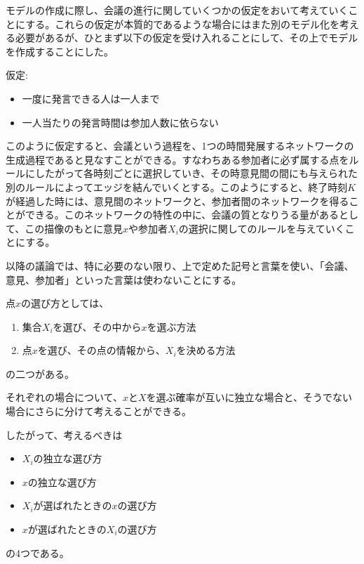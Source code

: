 モデルの作成に際し、会議の進行に関していくつかの仮定をおいて考えていくことにする。これらの仮定が本質的であるような場合にはまた別のモデル化を考える必要があるが、ひとまず以下の仮定を受け入れることにして、その上でモデルを作成することにした。

仮定:
\begin{itemize}
    \item 一度に発言できる人は一人まで
    \item 一人当たりの発言時間は参加人数に依らない
\end{itemize}

このように仮定すると、会議という過程を、1つの時間発展するネットワークの生成過程であると見なすことができる。すなわちある参加者に必ず属する点をルールにしたがって各時刻ごとに選択していき、その時意見間の間にも与えられた別のルールによってエッジを結んでいくとする。このようにすると、終了時刻$K$が経過した時には、意見間のネットワークと、参加者間のネットワークを得ることができる。このネットワークの特性の中に、会議の質となりうる量があるとして、この描像のもとに意見$x$や参加者$X_{i}$の選択に関してのルールを与えていくことにする。

以降の議論では、特に必要のない限り、上で定めた記号と言葉を使い、「会議、意見、参加者」といった言葉は使わないことにする。

点$x$の選び方としては、
\begin{enumerate}
    \item 集合$X_{i}$を選び、その中から$x$を選ぶ方法
    \item 点$x$を選び、その点の情報から、$X_{i}$を決める方法
\end{enumerate}
の二つがある。

それぞれの場合について、$x$と$X$を選ぶ確率が互いに独立な場合と、そうでない場合にさらに分けて考えることができる。

したがって、考えるべきは
\begin{itemize}
    \item $X_{i}$の独立な選び方
    \item $x$の独立な選び方
    \item $X_{i}$が選ばれたときの$x$の選び方
    \item $x$が選ばれたときの$X_{i}$の選び方
\end{itemize}
の4つである。
